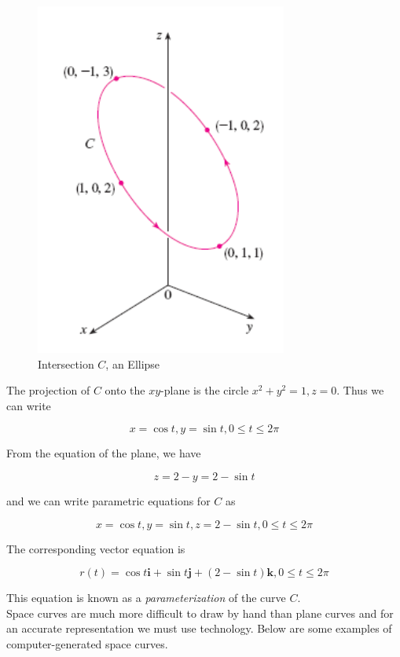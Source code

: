         \begin{figure}[hbt!]
            \centering
            \caption*{Intersection $C$, an Ellipse}
            \includegraphics[scale = 0.6]{Resources/13.1_Intersection_C}
        \end{figure}

        The projection of $C$ onto the $xy$-plane is the circle $x^2 + y^2 = 1, z = 0$. Thus we can write

        \[
            x = \cos{t}, y = \sin{t}, 0 \leq t\leq 2\pi
        \]

        From the equation of the plane, we have

        \[
            z = 2- y = 2-\sin{t}
        \]

        and we can write parametric equations for $C$ as

        \[
            x = \cos{t}, y = \sin{t},  z = 2-\sin{t}, 0 \leq t \leq 2\pi
        \]

        The corresponding vector equation is

        \[
            r(t) = \cos{t}\mathbf{i} + \sin{t}\mathbf{j} + (2-\sin{t})\mathbf{k}, 0 \leq t\leq 2\pi
        \]

        This equation is known as a \textit{parameterization} of the curve $C$. \\

        Space curves are much more difficult to draw by hand than plane curves and for an accurate representation we must use technology. Below are some examples of computer-generated space curves.

